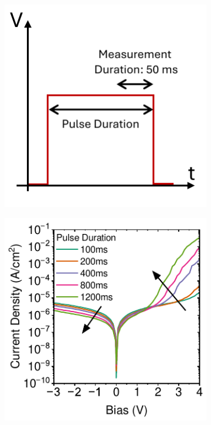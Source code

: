 \begin{figure}[htbp]
    \begin{subfigure}[b]{0.35\textwidth}
        \centering        
        \includegraphics[width=\textwidth]{chapters/material_properties/images/PAIOS_Pulsed_Measurement.pdf}
        \caption{}
        \label{fig:ch2:pulsed_meas_PAIOS}
    \end{subfigure}
    \hfill
    \begin{subfigure}[b]{0.4\textwidth}
        \centering
        \includegraphics[width=\textwidth]{chapters/material_properties/images/Pulsed-PAIOS-plot.pdf}
        \caption{}
        \label{fig:ch2:pulsed_paios}
    \end{subfigure}



\end{figure}
